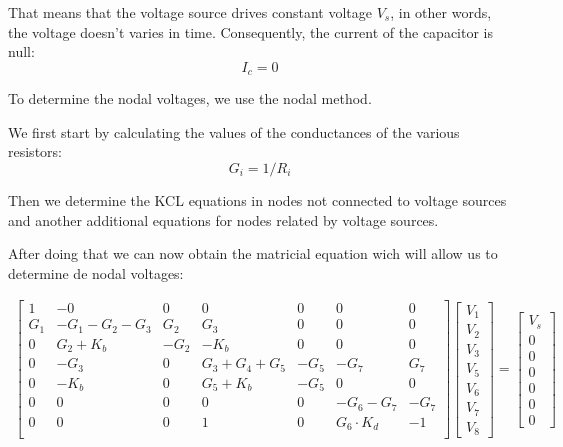 That means that the voltage source drives constant voltage $V_s$, in other words, the voltage doesn't varies in time.
Consequently, the current of the capacitor is null:
\begin{equation}
  I_c=0
\end{equation}

To determine the nodal voltages, we use the nodal method.

We first start by calculating the values of the conductances of the various resistors:
\begin{equation}
  G_i=1/R_i
\end{equation}

Then we determine the KCL equations in nodes not connected to voltage sources and another additional equations for nodes 
related by voltage sources.

After doing that we can now obtain the matricial equation wich will allow us to determine de nodal voltages:

\begin{gather}
	\begin{bmatrix}
		1 & -0 & 0 & 0 & 0 & 0 & 0 \\
		G_1 & -G_1 - G_2 - G_3 & G_2 & G_3 & 0 & 0 & 0 \\
		0 & G_2 + K_b & -G_2 & -K_b & 0 & 0 & 0 \\
		0 & -G_3 & 0 & G_3+G_4+G_5 & -G_5 & -G_7 & G_7 \\
		0 & -K_b & 0 & G_5+K_b & -G_5 & 0 & 0 \\
		0 & 0 & 0 & 0 & 0 & -G_6-G_7 & -G_7 \\
		0 & 0 & 0 & 1 & 0 & G_6\cdot K_d & -1 \\
	\end{bmatrix}
	\begin {bmatrix} V_1 \\ V_2 \\ V_3 \\ V_5  \\ V_6 \\ V_7 \\ V_8 \end{bmatrix}
	=
	\begin {bmatrix} V_s  \\ 0  \\ 0  \\ 0 \\ 0  \\ 0 \\ 0 \end{bmatrix}
\end{gather}

